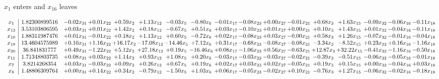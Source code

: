 \documentclass[9pt]{article}
\begin{document}
 $ x_{1} $ enters and $ x_{16} $ leaves 

 \[\begin{array}{c| c c@{\hskip 2pt} c@{\hskip 2pt} c@{\hskip 2pt} c@{\hskip 2pt} c@{\hskip 2pt} c@{\hskip 2pt} c@{\hskip 2pt} c@{\hskip 2pt} c@{\hskip 2pt} c@{\hskip 2pt} c@{\hskip 2pt} c@{\hskip 2pt} c@{\hskip 2pt} c@{\hskip 2pt} c@{\hskip 2pt} }
 x_{1}   &  1.82300899516 & -0.02 x_{31} & +  0.01 x_{22} & +  0.59 x_{2} & +  1.13 x_{12} & -0.03 x_{5} & -0.80 x_{6} & -0.01 x_{17} & -0.08 x_{23} & +  0.00 x_{27} & -0.01 x_{21} & +  0.68 x_{3} & +  1.63 x_{15} & -0.09 x_{32} & -0.06 x_{16} & -0.11 x_{18}\\
 x_{13}   &  3.53103806595 & +  0.03 x_{31} & +  0.01 x_{22} & +  1.42 x_{2} & +  0.18 x_{12} & -0.67 x_{5} & +  0.51 x_{6} & +  0.03 x_{17} & -0.10 x_{23} & +  0.01 x_{27} & +  0.00 x_{21} & +  0.10 x_{3} & +  1.43 x_{15} & +  0.01 x_{32} & -0.04 x_{16} & -0.11 x_{18}\\
 x_{10}   &  1.88311987476 & +  0.01 x_{31} & -0.01 x_{22} & +  0.18 x_{2} & +  1.13 x_{12} & +  0.60 x_{5} & -0.72 x_{6} & +  0.02 x_{17} & -0.08 x_{23} & +  0.03 x_{27} & -0.00 x_{21} & +  0.58 x_{3} & +  1.26 x_{15} & -0.07 x_{32} & -0.01 x_{16} & -0.04 x_{18}\\
 x_{19}   &  13.4604575989 & +  0.10 x_{31} & +  1.16 x_{22} & + 16.17 x_{2} & -17.08 x_{12} & -14.46 x_{5} & +  7.12 x_{6} & +  0.31 x_{17} & -0.68 x_{23} & -0.08 x_{27} & -0.08 x_{21} & -3.34 x_{3} & -8.52 x_{15} & +  0.23 x_{32} & +  0.16 x_{16} & -1.16 x_{18}\\
 x_{20}   &  36.841831777 & +  0.49 x_{31} & -1.22 x_{22} & +  5.12 x_{2} & + 27.18 x_{12} & +  0.19 x_{5} & -16.46 x_{6} & +  0.08 x_{17} & -1.06 x_{23} & +  0.56 x_{27} & -0.63 x_{21} & + 12.87 x_{3} & + 32.22 x_{15} & -0.41 x_{32} & -1.16 x_{16} & -0.50 x_{18}\\
 x_{11}   &  1.71348803735 & +  0.08 x_{31} & +  0.03 x_{22} & +  1.14 x_{2} & +  0.93 x_{12} & +  1.08 x_{5} & +  0.20 x_{6} & -0.03 x_{17} & -0.03 x_{23} & -0.03 x_{27} & -0.02 x_{21} & -0.39 x_{3} & -0.51 x_{15} & -0.06 x_{32} & -0.05 x_{16} & -0.01 x_{18}\\
 x_{7}   &  3.8214268354 & +  0.03 x_{31} & -0.03 x_{22} & +  0.09 x_{2} & +  0.26 x_{12} & +  0.67 x_{5} & +  0.19 x_{6} & +  0.02 x_{17} & +  0.03 x_{23} & +  0.02 x_{27} & -0.05 x_{21} & +  0.19 x_{3} & +  0.15 x_{15} & +  0.00 x_{32} & -0.04 x_{16} & +  0.03 x_{18}\\
 x_{8}   &  1.48806309764 & +  0.00 x_{31} & +  0.14 x_{22} & +  0.34 x_{2} & -0.79 x_{12} & -1.50 x_{5} & +  1.03 x_{6} & +  0.06 x_{17} & -0.05 x_{23} & -0.02 x_{27} & +  0.10 x_{21} & -0.76 x_{3} & +  1.27 x_{15} & -0.06 x_{32} & -0.02 x_{16} & -0.18 x_{18}\\

\end{array}\]
\end{document}
